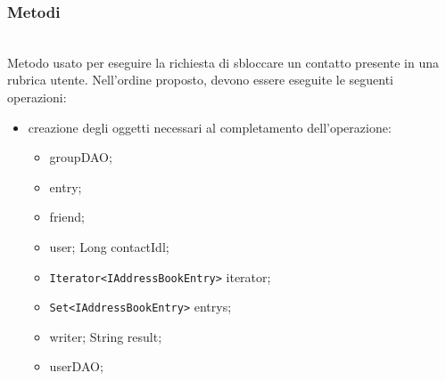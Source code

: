 \subsubsection*{Metodi}

\begin{description}
	\item{}\\	
	Metodo usato per eseguire la richiesta di sbloccare un contatto presente in una rubrica utente. Nell'ordine proposto, devono essere eseguite le seguenti operazioni:
	\begin{itemize}
		\item creazione degli oggetti necessari al completamento dell'operazione:
		\begin{itemize}
			\item {} groupDAO;
			\item {} entry;
			\item {} friend;
			\item {} user;
			Long contactIdl;
			\item \texttt{Iterator<IAddressBookEntry>} iterator;
			\item \texttt{Set<IAddressBookEntry>} entrys;
			\item {} writer;
			String result;
			\item {} userDAO;
		\end{itemize}
		

\end{itemize}
\end{description}
